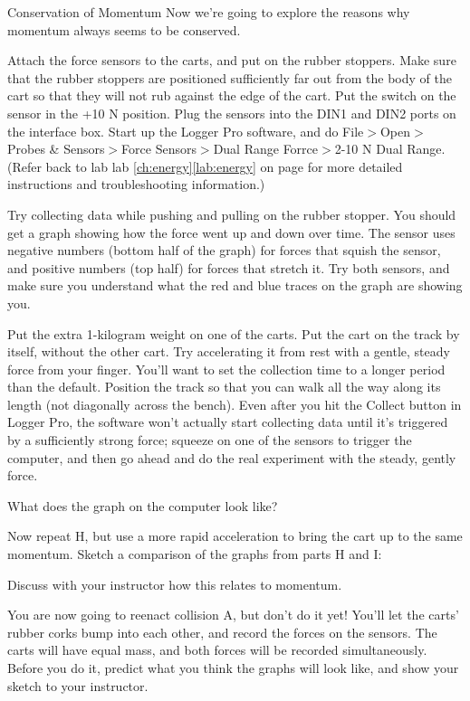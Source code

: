 \begin{lab}{Conservation of Momentum}
Now we're going to explore the reasons why momentum always seems to be conserved.

Attach the force sensors to the carts, and put on the rubber
 stoppers. Make sure that the rubber stoppers are positioned
 sufficiently far out from the body of the cart so that they
 will not rub against the edge of the cart. Put the switch on
 the sensor in the +10 N position. Plug the sensors into the 
DIN1 and DIN2 ports on the interface box. Start up the Logger
 Pro software, and do File$>$Open$>$Probes \& Sensors$>$Force
 Sensors$>$Dual Range Forrce$>$2-10 N Dual Range. (Refer back to lab
lab \ref{ch:energy}\ref{lab:energy} on page
\pageref{lab:energy} for more detailed instructions and troubleshooting
information.)

Try collecting data while pushing and pulling on the rubber stopper. You should get a graph showing how the force went
 up and down over time. The sensor uses negative numbers (bottom half of the graph) for forces that squish the sensor,
 and positive numbers (top half) for forces that stretch it. Try both sensors, and make sure you understand what the red
 and blue traces on the graph are showing you.


Put the extra 1-kilogram weight on one of the carts. Put the cart on the track by itself, without the other cart. Try accelerating it from rest
 with a gentle, steady force from your finger.  You'll want to set the collection
time to a longer period than the default. Position the track so that you can walk all the way along its
length (not diagonally across the bench). Even after you hit the Collect button in Logger Pro, the software
won't actually start collecting data until it's triggered by a sufficiently strong force; squeeze on
one of the sensors to trigger the computer, and then go ahead and do the real experiment with the steady,
gently force.

What does the graph on the computer look like?

 Now repeat H, but use a more rapid acceleration to bring the cart up to the same momentum. Sketch a comparison of the graphs from parts H and I:




Discuss with your instructor how this relates to momentum.

You are now going to reenact collision A, but don't do it yet! You'll let the carts' rubber corks bump into each other,
 and record the forces on the sensors. The carts will have equal mass, and both forces will be recorded simultaneously. Before you do it,
predict what you think the graphs will look like, and show your sketch to your instructor.


\end{lab}
